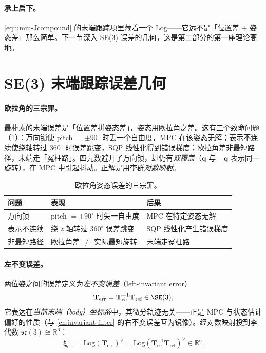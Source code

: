 \paragraph{承上启下。}
\cref{eq:umm-Jcompound} 的末端跟踪项里藏着一个 $\mathrm{Log}$——它远不是「位置差 + 姿态差」那么简单。下一节深入 SE(3) 误差的几何，这是第二部分的第一座理论高地。

\section{SE(3) 末端跟踪误差几何}
\label{sec:umm-se3}

\paragraph{欧拉角的三宗罪。}
最朴素的末端误差是「位置差拼姿态差」，姿态用欧拉角之差。这有三个致命问题（\cref{tab:umm-euler}）：万向锁使 pitch $=\pm90^\circ$ 时丢一个自由度，MPC 在该姿态无解；表示不连续使绕轴转过 $360^\circ$ 时误差跳变，SQP 线性化得到错误梯度；欧拉角差非最短路径，末端走「冤枉路」。四元数避开了万向锁，却仍有\emph{双覆盖}（$\mathbf q$ 与 $-\mathbf q$ 表示同一旋转），在 MPC 中引起抖动。正解是用李群\emph{对数映射}。

\begin{table}[H]\centering\small
\caption{欧拉角姿态误差的三宗罪。}
\label{tab:umm-euler}
\begin{tabular}{lll}
\toprule
问题 & 表现 & 后果 \\
\midrule
万向锁 & pitch $=\pm90^\circ$ 时失一自由度 & MPC 在特定姿态无解 \\
表示不连续 & 绕 $z$ 轴转过 $360^\circ$ 误差跳变 & SQP 线性化产生错误梯度 \\
非最短路径 & 欧拉角差 $\neq$ 实际最短旋转 & 末端走冤枉路 \\
\bottomrule
\end{tabular}
\end{table}

\paragraph{左不变误差。}
两位姿之间的误差定义为\emph{左不变误差}（left-invariant error）
\begin{equation}
  \mathbf T_{\text{err}}=\mathbf T_{\text{ee}}^{-1}\mathbf T_{\text{ref}}\in\SE(3),
  \label{eq:umm-Terr}
\end{equation}
它表达在\emph{当前末端（body）坐标系}中，其微分轨迹无关——正是 MPC 与状态估计偏好的性质（与 \cref{ch:invariant-filter} 的右不变误差互为镜像）。经对数映射投到李代数 $\mathfrak{se}(3)\cong\mathbb R^6$：
\begin{equation}
  \boldsymbol\xi_{\text{err}}=\mathrm{Log}(\mathbf T_{\text{err}})^{\vee}=\mathrm{Log}(\mathbf T_{\text{ee}}^{-1}\mathbf T_{\text{ref}})^{\vee}\in\mathbb R^6.
  \label{eq:umm-xierr}
\end{equation}

